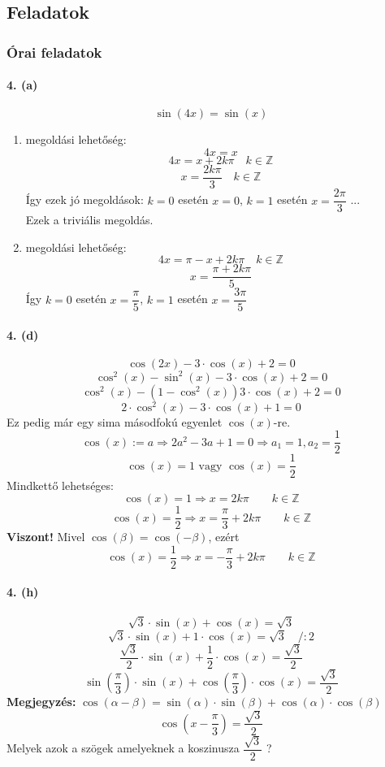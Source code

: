 \documentclass[12pt,a4paper,fleqn]{article}
\newcommand{\myparagraph}[1]{\paragraph{#1}\mbox{}}
\begin{document}
\subsection{Feladatok}
\subsubsection{Órai feladatok}


\myparagraph{4. (a)}
\[ \sin(4x) = \sin(x) \]
\begin{enumerate}
  \item megoldási lehetőség:
  \[ 4x = x \]
  \[ 4x = x + 2k\pi \quad k \in \mathbb{Z} \]
  \[ x = \dfrac{2k\pi}{3} \quad k \in \mathbb{Z} \]
  Így ezek jó megoldások: $k = 0$ esetén $x = 0$, $k = 1$ esetén $x =
    \dfrac{2\pi}{3}$ ... \\
  Ezek a triviális megoldás.
  \item megoldási lehetőség:
  \[ 4x = \pi - x + 2k\pi \quad k \in \mathbb{Z} \]
  \[ x = \dfrac{\pi + 2k\pi}{5} \]
  Így $k = 0$ esetén $x = \dfrac{\pi}{5}$, $k = 1$ esetén $x = \dfrac{3\pi}{5}$
\end{enumerate}


\myparagraph{4. (d)}
\[ \cos(2x) - 3 \cdot \cos(x) + 2 = 0 \]
\[ \cos^2(x) - \sin^2(x) - 3 \cdot \cos(x) + 2 = 0 \]
\[ \cos^2(x) - (1- \cos^2(x)) 3 \cdot \cos(x) + 2 = 0 \]
\[ 2 \cdot \cos^2(x) - 3 \cdot \cos(x) + 1 = 0 \]
Ez pedig már egy sima másodfokú egyenlet $\cos(x)$-re.
\[ \cos(x) := a \Rightarrow 2a^2 - 3a + 1 = 0 \Rightarrow a_1 = 1, a_2 =
  \frac{1}{2} \]
\[ \cos(x) = 1 \text{ vagy } \cos(x) = \frac{1}{2}\]
Mindkettő lehetséges:
\[ \cos(x) = 1 \Rightarrow x = 2k\pi \qquad k \in \mathbb{Z} \]
\[ \cos(x) = \dfrac{1}{2} \Rightarrow x = \dfrac{\pi}{3} + 2k\pi \qquad
  k \in \mathbb{Z} \]
\textbf{Viszont!} Mivel $\cos(\beta) = \cos(-\beta)$, ezért
\[ \cos(x) = \dfrac{1}{2} \Rightarrow x = -\dfrac{\pi}{3} + 2k\pi \qquad
  k \in \mathbb{Z} \]

\myparagraph{4. (h)}
\[ \sqrt{3} \cdot \sin(x) + \cos(x) = \sqrt{3} \]
\[ \sqrt{3} \cdot \sin(x) + 1 \cdot \cos(x) = \sqrt{3} \quad /:2 \]
\[ \dfrac{\sqrt{3}}{2} \cdot \sin(x) + \dfrac{1}{2} \cdot \cos(x) =
  \dfrac{\sqrt{3}}{2} \]
\[ \sin\left(\dfrac{\pi}{3}\right) \cdot \sin(x) +
\cos\left(\dfrac{\pi}{3}\right) \cdot \cos(x) = \dfrac{\sqrt{3}}{2} \]
\textbf{Megjegyzés:} $\cos(\alpha - \beta) =
  \sin(\alpha) \cdot \sin(\beta) + \cos(\alpha) \cdot \cos(\beta) $
\[ \cos\left( x - \dfrac{\pi}{3} \right) = \dfrac{\sqrt{3}}{2} \]
Melyek azok a szögek amelyeknek a koszinusza $\dfrac{\sqrt{3}}{2}$ ?
\end{document}
